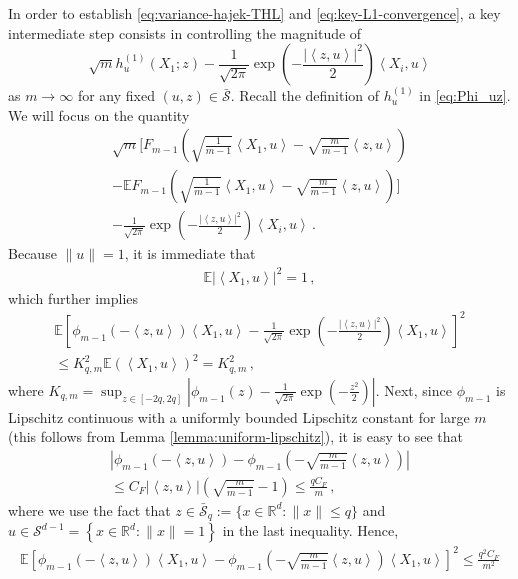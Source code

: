 \documentclass[12pt]{article}
\renewcommand{\exp}[1]{\operatorname{exp}\left(#1\right)} %
\def\l{\left}
\def\r{\right}
\newcommand{\mb}{\mathbb}
\newcommand{\dotp}[2]{\left\langle#1,#2\right\rangle}
\theoremstyle{thmstyletwo}%
\theoremstyle{thmstylethree}%
\begin{document}
In order to establish \eqref{eq:variance-hajek-THL} and \eqref{eq:key-L1-convergence}, a key intermediate step consists in controlling the magnitude of
    \[
    \sqrt{m}h^{(1)}_{u}(X_1;z) - \frac{1}{\sqrt{2\pi}}\exp{-\frac{\l\lvert \dotp{z}{u}\r\rvert^2}{2}}\dotp{X_i}{u}
    \]
    as $m \rightarrow \infty$ for any fixed $(u,z) \in \bar{\mathcal{S}}$. Recall the definition of $h^{(1)}_{u}$ in \eqref{eq:Phi_uz}. We will focus on the quantity
    \begin{multline*}
        \sqrt{m}\Biggl[F_{m-1} \left(\sqrt{\frac{1}{m-1}}\dotp{X_1}{u} - \sqrt{\frac{m}{m-1}}\dotp{z}{u}\right) \\
        - \mb E F_{m-1} \left(\sqrt{\frac{1}{m-1}}\dotp{X_1}{u} - \sqrt{\frac{m}{m-1}}\dotp{z}{u}\right)\Biggr] \\
        - \frac{1}{\sqrt{2\pi}}\exp{-\frac{\l\lvert \dotp{z}{u}\r\rvert^2}{2}}\dotp{X_i}{u} \,.
    \end{multline*}
    Because $\|u\| = 1$, it is immediate that
    \begin{align}\label{eq:2-moment-V1}
        \mb E \l\lvert \dotp{X_1}{u}\r\rvert^2  = 1\,,
    \end{align}
    which further implies
    \begin{multline*}
        \mb E\l[\phi_{m-1}\l(-\dotp{z}{u}\r)\dotp{X_1}{u}-\frac{1}{\sqrt{2\pi}}\exp{-\frac{\l\lvert \dotp{z}{u}\r\rvert^2}{2}}\dotp{X_1}{u}\r]^2 \\
        \leq K^2_{q,m} \mb E\l(\dotp{X_1}{u}\r)^2 = K^2_{q,m}\,,
    \end{multline*}
    where $K_{q,m} = \sup_{z \in [-2q,2q]}\l\lvert \phi_{m-1}(z) - \frac{1}{\sqrt{2\pi}}\exp{-\frac{z^2}{2}}\r\rvert$. Next, since $\phi_{m-1}$ is Lipschitz continuous with a uniformly bounded Lipschitz constant for large $m$ (this follows from Lemma \ref{lemma:uniform-lipschitz}), it is easy to see that
    \begin{multline*}
        \l\lvert \phi_{m-1}\l(-\dotp{z}{u}\r) - \phi_{m-1}\l(-\sqrt{\frac{m}{m-1}}\dotp{z}{u}\r) \r\rvert  \\
        \leq C_F \lvert \dotp{z}{u}\rvert  \l( \sqrt{\frac{m}{m-1}}  - 1\r)\leq \frac{qC_F}{m}\,,
    \end{multline*}
    where we use the fact that $z \in \bar{\mathcal{S}}_q := \{x \in \mb R^d: \|x\| \leq q\}$ and $u \in \mathcal{S}^{d-1} = \l\{x \in \mb R^d : \|x\| = 1\r\}$ in the last inequality. Hence,
    \begin{align*}
        \mb E \l[\phi_{m-1}\l(-\dotp{z}{u}\r)\dotp{X_1}{u} - \phi_{m-1}\l(-\sqrt{\frac{m}{m-1}}\dotp{z}{u}\r)\dotp{X_1}{u}\r]^2 \leq \frac{q^2C_F}{m^2}
    \end{align*}
\end{document}
